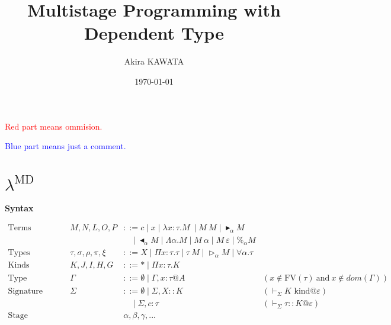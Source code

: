 \documentclass[9pt, a4paper]{extarticle}
\title{Multistage Programming with Dependent Type}
\author{Akira KAWATA}
\date{\today}
\theoremstyle{break}
\newcommand{\figheader}[2]{
  \begin{flushleft}
    #2 {\bf \normalsize #1}
\end{flushleft}}
\newcommand{\G}{\Gamma}
\newcommand{\V}{\vdash_\Sigma}
\newcommand{\iskind}{\text{\ kind}}
\newcommand{\TW}{\triangleright}
\newcommand{\F}{\forall}
\newcommand{\TB}{\blacktriangleright}
\newcommand{\TBL}{\blacktriangleleft}
\newcommand{\red}[1]{\textcolor{red}{ #1 }}
\newcommand{\blue}[1]{\textcolor{blue}{ #1 }}
\begin{document}
\maketitle

\red{Red part means ommision.}

\blue{Blue part means just a comment.}

\section{ $ \lambda^{\text{MD}} $ }

\figheader{Syntax}{}

\begin{align*}
	\textrm{Terms}             &  & M,N,L,O,P                & ::= c \mid x \mid \lambda x:\tau.M\ \mid M\ M \mid \TB_\alpha M                                                                                    \\
	                           &  &                          & \ \ \ \ \mid \TBL_\alpha M \mid \Lambda\alpha.M \mid M\ \alpha \mid M\ \varepsilon \mid \%_\alpha M                                                                       \\
	\textrm{Types}             &  & \tau,\sigma,\rho,\pi,\xi & ::= X \mid \Pi x:\tau.\tau \mid \tau\ M \mid \TW_{\alpha} M \mid \F\alpha.\tau                                                                     \\
	\textrm{Kinds}             &  & K,J,I,H,G                & ::= * \mid \Pi x:\tau.K                                                                                                                            \\
	\textrm{Type environments} &  & \Gamma                   & ::= \emptyset \mid \Gamma,x:\tau@A                                             & (x\not\in\textrm{FV}(\tau)\ \text{and}\ x\not\in\textit{dom}(\G)) \\
	\textrm{Signature}         &  & \Sigma                   & ::= \emptyset \mid \Sigma,X::K                                                 & (\V K \iskind @ \varepsilon)                                      \\
	                           &  &                          & \ \ \ \ \mid \Sigma,c:\tau                                                             & (\V \tau :: K @ \varepsilon)                                      \\
	\textrm{Stage variables}   &  &                          & \alpha,\beta,\gamma,...                                                                                                                            \\

\end{align*}
\end{document}
